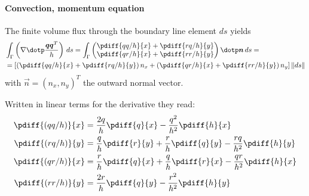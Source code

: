 \paragraph*{Convection, momentum equation}
The finite volume flux through the boundary line element $ds$ yields
\begin{align}
    &\int_\Gamma \left( \nabla \dotp \frac{\vec{q}\vec{q}^T}{h}\right) \, ds =
    \int_\Gamma
    \begin{pmatrix}
        \pdiff{qq/h}{x} + \pdiff{rq/h}{y} \\
        \pdiff{qr/h}{x} + \pdiff{rr/h}{y}
    \end{pmatrix}
    \dotp \vec{n}\, ds
    = \\
    & =
    \left[ \left( \pdiff{qq/h}{x} + \pdiff{rq/h}{y} \right) n_x +
    \left( \pdiff{qr/h}{x} + \pdiff{rr/h}{y} \right) n_y \right] \norm{ds}
\end{align}
with $\vec{n} = (n_x, n_y)^T$ the outward normal vector.

Written in linear terms for the derivative they read:
\begin{align}
    \pdiff{(qq/h)}{x} &= \frac{2q}{h}\pdiff{q}{x} -\frac{q^2}{h^2} \pdiff{h}{x}
    \\*
    \pdiff{(rq/h)}{y} &= \frac{q}{h}\pdiff{r}{y} + \frac{r}{h}\pdiff{q}{y} - \frac{rq}{h^2} \pdiff{h}{y}
    \\*
    \pdiff{(qr/h)}{x} &= \frac{r}{h}\pdiff{q}{x} + \frac{q}{h}\pdiff{r}{x} - \frac{qr}{h^2} \pdiff{h}{x}
    \\*
    \pdiff{(rr/h)}{y} &= \frac{2r}{h}\pdiff{q}{y} -\frac{r^2}{h^2} \pdiff{h}{y}
\end{align}

